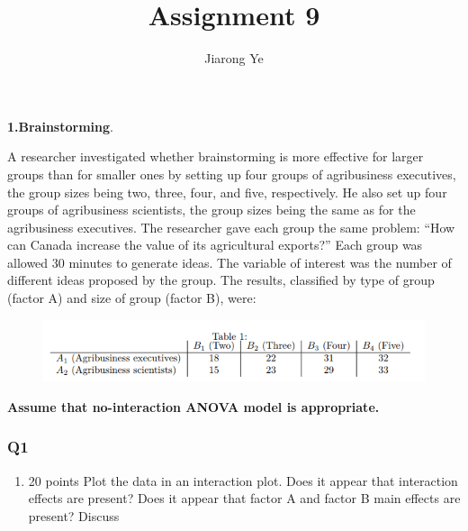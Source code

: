 \documentclass[11pt]{article}
\title{Assignment 9}
\author{Jiarong Ye}
\makeatletter
\def\maxwidth{\ifdim\Gin@nat@width>\linewidth\linewidth
    \else\Gin@nat@width\fi}
\let\Oldincludegraphics\includegraphics
\renewcommand{\includegraphics}[1]{\Oldincludegraphics[width=.8\maxwidth]{#1}}
\providecommand{\tightlist}{%
      \setlength{\itemsep}{0pt}\setlength{\parskip}{0pt}}
\makeatother
\begin{document}
    
    
    \maketitle
    
    

    
    \textbf{1.Brainstorming}.

A researcher investigated whether brainstorming is more effective for
larger groups than for smaller ones by setting up four groups of
agribusiness executives, the group sizes being two, three, four, and
five, respectively. He also set up four groups of agribusiness
scientists, the group sizes being the same as for the agribusiness
executives. The researcher gave each group the same problem: ``How can
Canada increase the value of its agricultural exports?'' Each group was
allowed 30 minutes to generate ideas. The variable of interest was the
number of different ideas proposed by the group. The results, classified
by type of group (factor A) and size of group (factor B), were:

\begin{figure}[H]
\centering
\includegraphics{1.png}
\caption{}
\end{figure}

\textbf{Assume that no-interaction ANOVA model is appropriate.}

    \subsubsection*{Q1}\label{q1}

\begin{enumerate}
\def\labelenumi{\arabic{enumi}.}
\tightlist
\item
  20 points Plot the data in an interaction plot. Does it appear that
  interaction effects are present? Does it appear that factor A and
  factor B main effects are present? Discuss
\end{enumerate}
\end{document}

